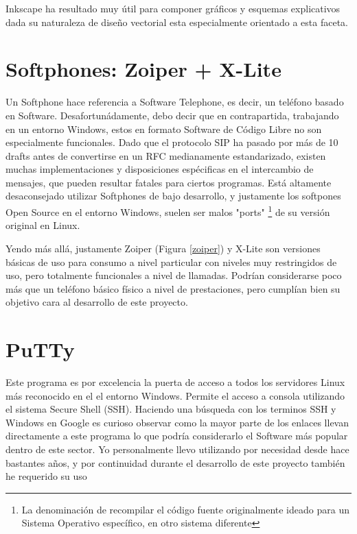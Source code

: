 Inkscape ha resultado muy útil para componer gráficos y esquemas explicativos dada su naturaleza de diseño vectorial esta especialmente orientado a esta faceta.


\section*{Softphones: Zoiper + X-Lite}

Un Softphone hace referencia a Software Telephone, es decir, un teléfono basado en Software. Desafortunádamente, debo decir que en contrapartida, trabajando en un entorno Windows, estos en formato Software de Código Libre no son especialmente funcionales. Dado que el protocolo SIP ha pasado por más de 10 drafts antes de convertirse en un RFC medianamente estandarizado, existen muchas implementaciones y disposiciones espécificas en el intercambio de mensajes, que pueden resultar fatales para ciertos programas. Está altamente desaconsejado utilizar Softphones de bajo desarrollo, y justamente los softpones Open Source en el entorno Windows, suelen ser malos "ports" \footnote{La denominación de recompilar el código fuente originalmente ideado para un Sistema Operativo específico, en otro sistema diferente} de su versión original en Linux.

Yendo más allá, justamente Zoiper (Figura \ref{zoiper}) y X-Lite son versiones básicas de uso para consumo a nivel particular con niveles muy restringidos de uso, pero totalmente funcionales a nivel de llamadas. Podrían considerarse poco más que un teléfono básico físico a nivel de prestaciones, pero cumplían bien su objetivo cara al desarrollo de este proyecto.


\section*{PuTTy}

Este programa es por excelencia la puerta de acceso a todos los servidores Linux más reconocido en el el entorno Windows. Permite el acceso a consola utilizando el sistema Secure Shell (SSH). Haciendo una búsqueda con los terminos SSH y Windows en Google es curioso observar como la mayor parte de los enlaces llevan directamente a este programa lo que podría considerarlo el Software más popular dentro de este sector. Yo personalmente llevo utilizando por necesidad desde hace bastantes años, y por continuidad durante el desarrollo de este proyecto también he requerido su uso

